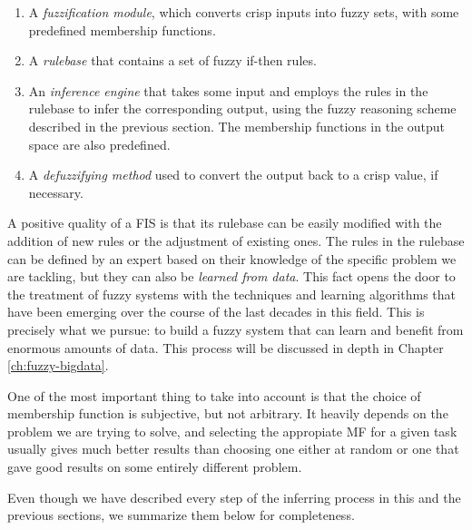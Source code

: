 \begin{enumerate}[1.]
  \item A \textit{fuzzification module}, which converts crisp inputs into fuzzy sets, with some predefined membership functions.
  \item A \textit{rulebase} that contains a set of fuzzy if-then rules.
  \item An \textit{inference engine} that takes some input and employs the rules in the rulebase to infer the corresponding output, using the fuzzy reasoning scheme described in the previous section. The membership functions in the output space are also predefined.
  \item A \textit{defuzzifying method} used to convert the output back to a crisp value, if necessary.
\end{enumerate}

A positive quality of a FIS is that its rulebase can be easily modified with the addition of new rules or the adjustment of existing ones. The rules in the rulebase can be defined by an expert based on their knowledge of the specific problem we are tackling, but they can also be \textit{learned from data}. This fact opens the door to the treatment of fuzzy systems with the techniques and learning algorithms that have been emerging over the course of the last decades in this field. This is precisely what we pursue: to build a fuzzy system that can learn and benefit from enormous amounts of data. This process will be discussed in depth in Chapter \ref{ch:fuzzy-bigdata}.

One of the most important thing to take into account is that the choice of membership function is subjective, but not arbitrary. It heavily depends on the problem we are trying to solve, and selecting the appropiate MF for a given task usually gives much better results than choosing one either at random or one that gave good results on some entirely different problem.

Even though we have described every step of the inferring process in this and the previous sections, we summarize them below for completeness.

